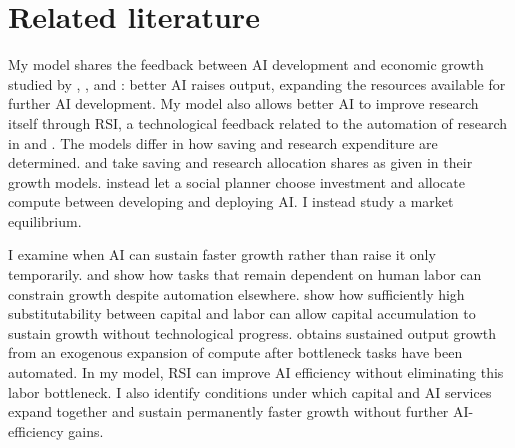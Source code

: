 \section{Related literature}
\label{sec:rewrite-literature}

My model shares the feedback between AI development and economic growth studied by \citet{davidsonetal2026}, \citet{jonestonetti2026}, and \citet{erdiletal2025gate}: better AI raises output, expanding the resources available for further AI development. My model also allows better AI to improve research itself through RSI, a technological feedback related to the automation of research in \citet{davidsonetal2026} and \citet{jonestonetti2026}. The models differ in how saving and research expenditure are determined. \citet{davidsonetal2026} and \citet{jonestonetti2026} take saving and research allocation shares as given in their growth models. \citet{erdiletal2025gate} instead let a social planner choose investment and allocate compute between developing and deploying AI. I instead study a market equilibrium.

I examine when AI can sustain faster growth rather than raise it only
temporarily. \citet{aghionjonesjones2019} and \citet{jonestonetti2026}
show how tasks that remain dependent on human labor can constrain growth
despite automation elsewhere.
\citet{palivoskaragiannis2010} show how sufficiently high substitutability
between capital and labor can allow capital accumulation to sustain growth
without technological progress. \citet{restrepo2025agi} obtains sustained
output growth from an exogenous expansion of compute after bottleneck tasks
have been automated.
In my model, RSI can improve AI efficiency without eliminating this labor
bottleneck. I also identify conditions under which capital and AI services
expand together and sustain permanently faster growth without further
AI-efficiency gains.

